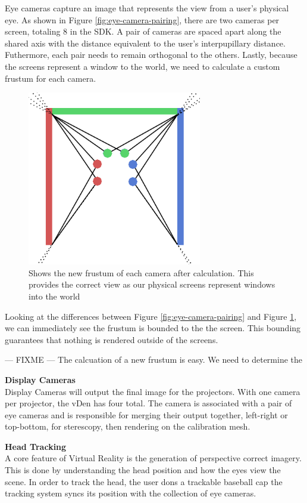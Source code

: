 Eye cameras capture an image that represents the view from a user's physical eye. As shown in Figure \ref{fig:eye-camera-pairing}, there are two cameras per screen, totaling 8 in the SDK. A pair of cameras are spaced apart along the shared axis with the distance equivalent to the user's interpupillary distance. Futhermore, each pair needs to remain orthogonal to the others. Lastly, because the screens represent a window to the world, we need to calculate a custom frustum for each camera.

\begin{figure}[H]
	\centering
	\includegraphics[width=3in]{images/camera-pairs-calibrated}
	\caption[The New Frustum of Eye Cameras]{Shows the new frustum of each camera after calculation. This provides the correct view as our physical screens represent windows into the world}
	\label{fig:eye-camera-frustum}
\end{figure}

Looking at the differences between Figure \ref{fig:eye-camera-pairing} and Figure \ref{fig:eye-camera-frustum}, we can immediately see the frustum is bounded to the the screen. This bounding guarantees that nothing is rendered outside of the screens. 

--- FIXME ---
The calcuation of a new frustum is easy. We need to determine the

\filbreak
\noindent\textbf{Display Cameras} \\
Display Cameras will output the final image for the projectors. With one camera per projector, the vDen has four total. The camera is associated with a pair of eye cameras and is responsible for merging their output together, left-right or top-bottom, for sterescopy, then rendering on the calibration mesh.

\filbreak
\noindent\textbf{Head Tracking} \\
A core feature of Virtual Reality is the generation of perspective correct imagery. This is done by understanding the head position and how the eyes view the scene. In order to track the head, the user dons a trackable baseball cap the tracking system syncs its position with the collection of eye cameras.

\label{sec:dashboardSection} \\

\clearpage
